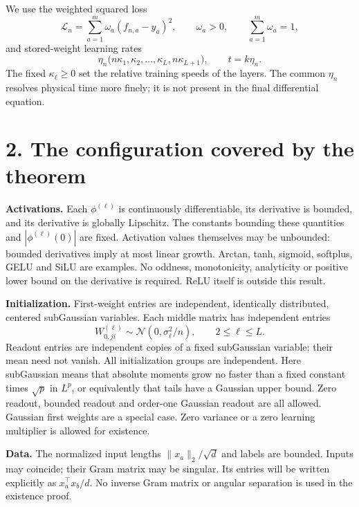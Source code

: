 We use the weighted squared loss
\[
\mathcal L_n=\sum_{a=1}^m\omega_a(f_{n,a}-y_a)^2,
\qquad \omega_a>0,\qquad\sum_{a=1}^m\omega_a=1,
\]
and stored-weight learning rates
\[
\eta_n\bigl(n\kappa_1,\kappa_2,\ldots,\kappa_L,n\kappa_{L+1}\bigr),
\qquad t=k\eta_n.
\]
The fixed $\kappa_\ell\ge0$ set the relative training speeds of the layers.
The common $\eta_n$ resolves physical time more finely; it is not present
in the final differential equation.

\newpage
\section*{2. The configuration covered by the theorem}

\textbf{Activations.} Each $\phi^{(\ell)}$ is continuously differentiable,
its derivative is bounded, and its derivative is globally Lipschitz.
The constants bounding these quantities and $|\phi^{(\ell)}(0)|$ are fixed.
Activation values themselves may be unbounded: bounded derivatives imply
at most linear growth. Arctan, tanh, sigmoid, softplus, GELU and SiLU are
examples. No oddness, monotonicity, analyticity or positive lower bound on
the derivative is required. ReLU itself is outside this result.

\textbf{Initialization.} First-weight entries are independent, identically
distributed, centered subGaussian variables. Each middle matrix has
independent entries
\[
W_{0,ji}^{(\ell)}\sim
\mathcal N(0,\sigma_\ell^2/n),\qquad 2\le\ell\le L.
\]
Readout entries are independent copies of a fixed subGaussian variable;
their mean need not vanish. All initialization groups are independent.
Here subGaussian means that absolute moments grow no faster than a fixed
constant times $\sqrt p$ in $L^p$, or equivalently that tails have a Gaussian
upper bound. Zero readout, bounded readout and order-one Gaussian readout
are all allowed. Gaussian first weights are a special case. Zero variance
or a zero learning multiplier is allowed for existence.

\textbf{Data.} The normalized input lengths $\|x_a\|_2/\sqrt d$ and labels
are bounded. Inputs may coincide; their Gram matrix may be singular. Its
entries will be written explicitly as $x_a^\top x_b/d$. No inverse Gram
matrix or angular separation is used in the existence proof.

